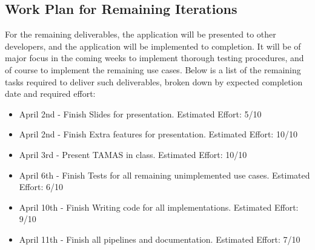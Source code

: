 \documentclass[12pt]{report}
\begin{document}
\begin{appendix}
	\chapter{Work Plan for Remaining Iterations}
For the remaining deliverables, the application will be presented to other developers, and the
application will be implemented to completion. It will be of major focus in the coming weeks to
implement thorough testing procedures, and of course to implement the remaining use cases. Below is
a list of the remaining tasks required to deliver such deliverables, broken down by expected
completion date and required effort:

\begin{itemize}
   \item April 2nd - Finish Slides for presentation. Estimated Effort: 5/10
   \item April 2nd - Finish Extra features for presentation. Estimated Effort: 10/10
   \item  April 3rd - Present TAMAS in class. Estimated Effort: 10/10 
   \item  April 6th - Finish Tests for all remaining unimplemented use cases. Estimated Effort: 6/10
   \item  April 10th - Finish Writing code for all implementations. Estimated Effort: 9/10
   \item April 11th - Finish all pipelines and documentation. Estimated Effort: 7/10
\end{itemize}
\end{appendix}
\end{document}
